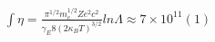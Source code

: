 $∫\eta=\frac{\pi^{1/2}m^{1/2}_{e}Ze^{2}c^{2}}{\gamma_{E}8(2\kappa_{B}T)^{3/2}} lnΛ\approx7×10^{11}       (1)$

